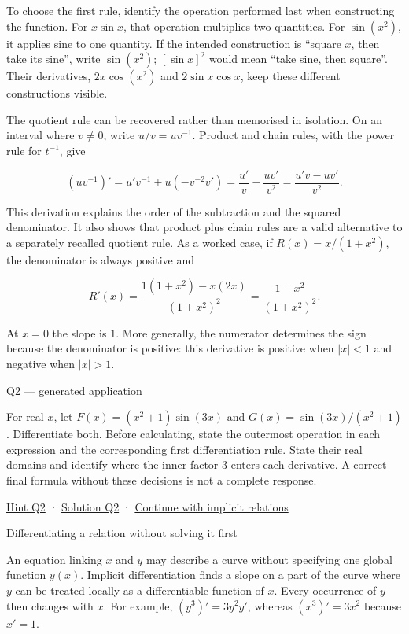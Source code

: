 \documentclass[
  11pt,
]{article}
\providecommand{\gt}{>}
\providecommand{\lt}{<}
\begin{document}
To choose the first rule, identify the operation performed last when
constructing the function. For \(x\sin x\), that operation multiplies
two quantities. For \(\sin(x^2)\), it applies sine to one quantity. If
the intended construction is ``square \(x\), then take its sine'', write
\(\sin(x^2)\); \([\sin x]^2\) would mean ``take sine, then square''.
Their derivatives, \(2x\cos(x^2)\) and \(2\sin x\cos x\), keep these
different constructions visible.

The quotient rule can be recovered rather than memorised in isolation.
On an interval where \(v\ne0\), write \(u/v=uv^{-1}\). Product and chain
rules, with the power rule for \(t^{-1}\), give

\[(uv^{-1})'=u'v^{-1}+u(-v^{-2}v')
=\frac{u'}v-\frac{uv'}{v^2}
=\frac{u'v-uv'}{v^2}.\]

This derivation explains the order of the subtraction and the squared
denominator. It also shows that product plus chain rules are a valid
alternative to a separately recalled quotient rule. As a worked case, if
\(R(x)=x/(1+x^2)\), the denominator is always positive and

\[R'(x)=\frac{1(1+x^2)-x(2x)}{(1+x^2)^2}
=\frac{1-x^2}{(1+x^2)^2}.\]

At \(x=0\) the slope is \(1\). More generally, the numerator determines
the sign because the denominator is positive: this derivative is
positive when \(|x|\lt 1\) and negative when \(|x|\gt 1\).

Q2 --- generated application

For real \(x\), let \(F(x)=(x^2+1)\sin(3x)\) and
\(G(x)=\sin(3x)/(x^2+1)\). Differentiate both. Before calculating, state
the outermost operation in each expression and the corresponding first
differentiation rule. State their real domains and identify where the
inner factor \(3\) enters each derivative. A correct final formula
without these decisions is not a complete response.

\protect\hyperlink{hint-q2}{Hint Q2} ·
\protect\hyperlink{solution-q2}{Solution Q2} ·
\protect\hyperlink{implicit}{Continue with implicit relations}

Differentiating a relation without solving it first

An equation linking \(x\) and \(y\) may describe a curve without
specifying one global function \(y(x)\). Implicit differentiation finds
a slope on a part of the curve where \(y\) can be treated locally as a
differentiable function of \(x\). Every occurrence of \(y\) then changes
with \(x\). For example, \((y^3)'=3y^2y'\), whereas \((x^3)'=3x^2\)
because \(x'=1\).
\end{document}
